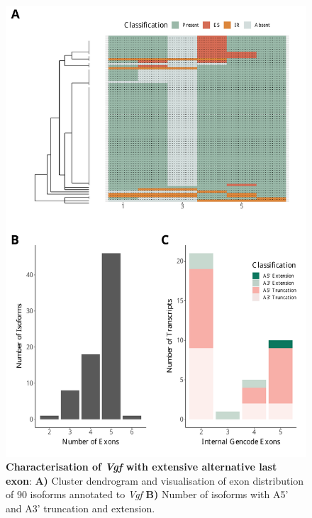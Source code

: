 \begin{figure}[htp]
	\begin{center}
		\includegraphics[page=10,trim={1cm 1cm 0 2cm},scale = 0.55]{Figures/TargetGenes.pdf}
	\end{center}
	\captionsetup{width=0.95\textwidth}
	\caption[Characterisation of \textit{Vgf} with extensive alternative last exon]%
	{\textbf{Characterisation of \textit{Vgf} with extensive alternative last exon}: \textbf{A)} Cluster dendrogram and visualisation of exon distribution of 90 isoforms annotated to \textit{Vgf} \textbf{B)} Number of isoforms with A5' and A3' truncation and extension.
	}   
	\label{fig:vgf}
\end{figure}


